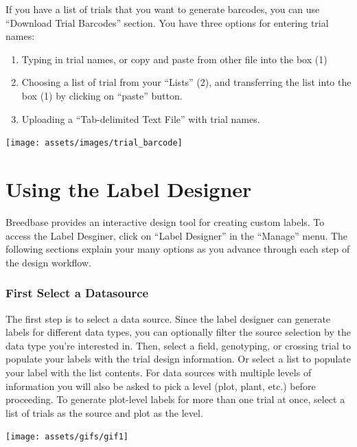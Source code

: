 \documentclass[
  12pt,
]{book}
\begin{document}
If you have a list of trials that you want to generate barcodes, you can use ``Download Trial Barcodes'' section. You have three options for entering trial names:

\begin{enumerate}
\def\labelenumi{\arabic{enumi}.}
\item
  Typing in trial names, or copy and paste from other file into the box (1)
\item
  Choosing a list of trial from your ``Lists'' (2), and transferring the list into the box (1) by clicking on ``paste'' button.
\item
  Uploading a ``Tab-delimited Text File'' with trial names.
\end{enumerate}

\begin{center}\texttt{[image: assets/images/trial\_barcode]} \end{center}

\hypertarget{using-the-label-designer}{%
\chapter{Using the Label Designer}\label{using-the-label-designer}}

Breedbase provides an interactive design tool for creating custom labels. To access the Label Desginer, click on ``Label Designer'' in the ``Manage'' menu. The following sections explain your many options as you advance through each step of the design workflow.

\hypertarget{first-select-a-datasource}{%
\subsection{First Select a Datasource}\label{first-select-a-datasource}}

The first step is to select a data source. Since the label designer can generate labels for different data types, you can optionally filter the source selection by the data type you're interested in. Then, select a field, genotyping, or crossing trial to populate your labels with the trial design information. Or select a list to populate your label with the list contents. For data sources with multiple levels of information you will also be asked to pick a level (plot, plant, etc.) before proceeding. To generate plot-level labels for more than one trial at once, select a list of trials as the source and plot as the level.

\begin{center}\texttt{[image: assets/gifs/gif1]} \end{center}
\end{document}

